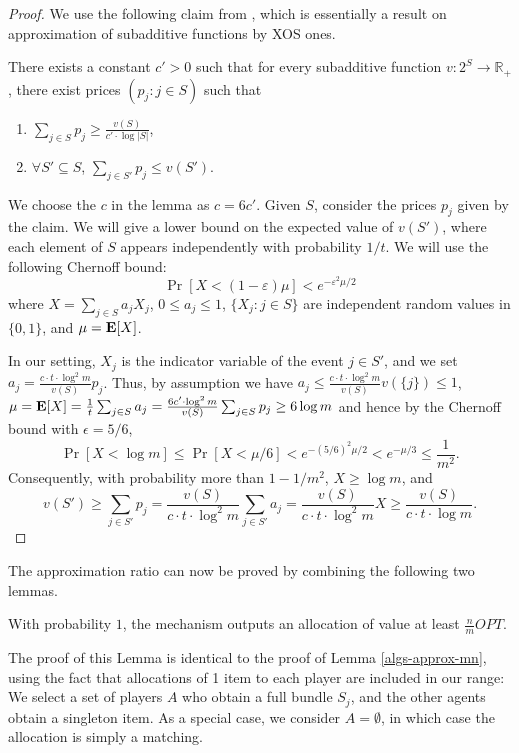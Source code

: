 \documentclass{theoretics}
\newcommand{\eps}{\varepsilon}
\newcommand{\R}{\mathbb{R}}
\newcommand{\E}{\mbox{\bf E}}
\begin{document}
\begin{proof}
We use the following claim from \cite{D07}, which is essentially a result on approximation of subadditive functions by XOS ones.

\begin{claim*}[\cite{D07}]\label{claim-xos-approx}
There exists a constant $c'>0$ such that for every subadditive function $v:2^S \to \R_+$, there exist prices $(p_j: j \in S)$ such that
\begin{enumerate}
\item $\sum_{j \in S} p_j \geq \frac{v(S)}{c'\cdot \log |S|}$,
\item $\forall S' \subseteq S$,  $\sum_{j \in S'} p_j \leq v(S')$.
\end{enumerate}
\end{claim*}

We choose the $c$ in the lemma as $c = 6c'$. Given $S$, consider the prices $p_j$ given by the claim. 
We will give a lower bound on the expected value of $v(S')$, where each element of $S$ appears independently with probability $1/t$. We will use the following Chernoff bound:
$$
\Pr[X<(1-\eps)\mu] < e^{-\eps^2 \mu / 2}
$$
where $X = \sum_{j \in S} a_j X_j$, $0 \leq a_j \leq 1$, $\{X_j: j \in S\}$ are independent random values in $\{0,1\}$, and $\mu=\E[X]$. 

In our setting, $X_j$ is the indicator variable of the event $j \in S'$, and we set $a_j =  \frac{c \cdot t \cdot \log^2 m} {v(S)}  p_j$. Thus, by assumption we have
$a_j \leq  \frac{c \cdot t \cdot \log^2 m} {v(S)}  v(\{j\}) \leq 1$, $\mu = \E[X] = \frac{1}{t} \sum_{j \in S} a_j = \frac{6c' \cdot \log^2 m} {v(S)}  \sum_{j \in S} p_j \geq 6 \log m$ and hence by the Chernoff bound with $\epsilon=5/6$,
$$
\Pr[X < \log m] \leq \Pr[X<\mu/6] < e^{-(5/6)^2 \mu / 2} < e^{-\mu/3} \leq \frac{1}{m^2}.
$$
Consequently, with probability more than $1-1/m^2$, $X \geq \log m$, and
$$
v(S') \geq \sum_{j \in S'} p_j = \frac{v(S)}{c \cdot t \cdot \log^2 m} \sum_{j \in S'} a_j
 = \frac{v(S)}{c \cdot t \cdot \log^2 m} X \geq \frac{v(S)}{c \cdot t \cdot \log m}.
$$
\end{proof}

The approximation ratio can now be proved by combining the following two lemmas.

\begin{lemma}
With probability $1$, the mechanism outputs an allocation of value at least $\frac{n}{m} OPT$.
\end{lemma}

The proof of this Lemma is identical to the proof of Lemma \ref{algs-approx-mn}, using the fact that allocations of 1 item to each player are included in our range:
We select a set of players $A$ who obtain a full bundle $S_j$, and the other agents obtain a singleton item. As a special case, we consider $A = \emptyset$, in which case the allocation is simply a matching.
\end{document}
